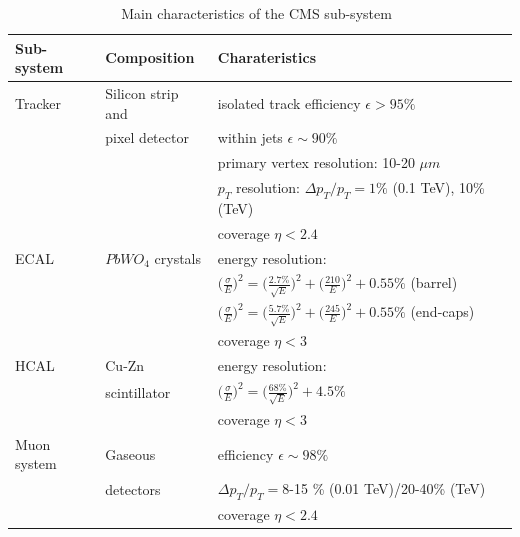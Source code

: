 \begin{table}
\centering
\begin{tabular}[!htbp]{l l l}
\hline
{\textbf{Sub-system}} & {\textbf{Composition}} & {\textbf{Charateristics}} \\
\hline
Tracker  & Silicon strip and  & isolated track efficiency $\epsilon > 95\%$ \\
	& pixel detector	& within jets $\epsilon \sim 90\%$ \\
	& 	& primary vertex resolution: 10-20 $\mu m$ \\
	& 	& $p_T$ resolution: $\Delta p_T/p_T = 1\%$ (0.1 TeV), 10\% (TeV)\\
	& 	& coverage $\eta<2.4$ \\
\hline
ECAL 	& 	$PbWO_4$ crystals 	& energy resolution:\\
		& 	& $\big(\frac{\sigma}{E}\big)^2 = \big(\frac{2.7\%}{\sqrt{E}}\big)^2 + \big(\frac{210}{E}\big)^2 + 0.55\% $  (barrel)\\
		& 	& $\big(\frac{\sigma}{E}\big)^2 = \big(\frac{5.7\%}{\sqrt{E}}\big)^2 + \big(\frac{245}{E}\big)^2 + 0.55\% $  (end-caps)\\
		& 	& coverage $\eta < 3$ \\
\hline
HCAL 	& 	Cu-Zn 	& energy resolution:\\
		& 	scintillator & $\big(\frac{\sigma}{E}\big)^2 = \big(\frac{68\%}{\sqrt{E}}\big)^2 + 4.5\%$ \\
		& 	& coverage $\eta < 3$ \\
\hline
Muon system & Gaseous & efficiency $\epsilon \sim 98\%$ \\
			& detectors & $\Delta p_T/p_T =$8-15 \% (0.01 TeV)/20-40\% (TeV)\\
		& 	& coverage $\eta < 2.4$ \\
\hline
\end{tabular}
\caption{Main characteristics of the CMS sub-system~\cite{JeremieThesis}}
\label{table:CMSMainChar}
\end{table}


